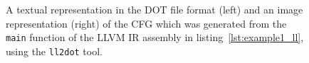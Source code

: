 \begin{figure}[htbp]
\begin{subfigure}[ht]{0.20\textwidth}
	\end{subfigure}
	\caption{A textual representation in the DOT file format (left) and an image representation (right) of the CFG which was generated from the \texttt{main} function of the LLVM IR assembly in listing~\ref{lst:example1_ll}, using the \texttt{ll2dot} tool.}
	\label{fig:example1_unstructured_cfg}
\end{figure}
